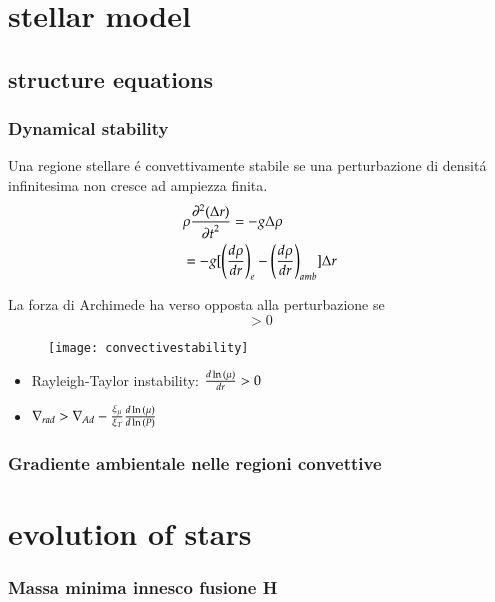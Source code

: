 \documentclass[main.tex]{subfiles}
\begin{document}
\chapter{stellar model}

\section{structure equations} 

\subsection{Dynamical stability}

Una regione stellare \'e convettivamente stabile se una perturbazione di densit\'a infinitesima non cresce ad ampiezza finita.
\begin{align*}
&\rho\PtwoDy{t}{(\Delta r)}=-g\Delta\rho\\
&=-g[\Dcvar{\TDy{r}{\rho}}{e}-\Dcvar{\TDy{r}{\rho}}{amb}]\Delta r
\end{align*}

La forza di Archimede ha verso opposta alla perturbazione se
\begin{equation*}
[\Dcvar{\TDy{r}{\rho}}{e}-\Dcvar{\TDy{r}{\rho}}{amb}]>0
\end{equation*}

\begin{figure}[!ht]
\texttt{[image: convectivestability]}\label{fig:convectivestability}
\end{figure}

\begin{itemize}
    \item Rayleigh-Taylor instability: $\TDy{r}{\ln{(\mu)}}>0$
    \item $\nrad>\nad-\frac{\xi_{\mu}}{\xi_T}\TDly{(P)}{(\mu)}$
\end{itemize}
		
\subsection{Gradiente ambientale nelle regioni convettive}



\chapter{evolution of stars}

\subsection{Massa minima innesco fusione H}
\end{document}
